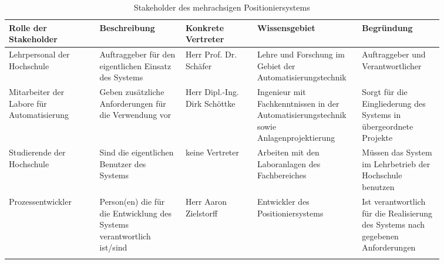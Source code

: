 \documentclass[../../../Bachelorarbeit.tex]{subfiles}
\begin{document}
\begin{longtable}[C]{| R{0.19\linewidth} | R{0.18\linewidth} | R{0.15\linewidth} | R{0.17\linewidth} | R{0.17\linewidth} |}
    \hline
    \textbf{Rolle der Stakeholder} & \textbf{Beschreibung} & \textbf{Konkrete Vertreter} & \textbf{Wissensgebiet} & \textbf{Begründung} \\ \hline
    Lehrpersonal der Hochschule & Auftraggeber für den eigentlichen Einsatz des Systems & Herr Prof. Dr. Schäfer \newline{}  & Lehre und Forschung im Gebiet der Automatisierungstechnik & Auftraggeber und Verantwortlicher \\ \hline
    Mitarbeiter der Labore für Automatisierung & Geben zusätzliche Anforderungen für die Verwendung vor & Herr Dipl.-Ing. Dirk Schöttke \newline{}  & Ingenieur mit Fachkenntnissen in der Automatisierungstechnik sowie Anlagenprojektierung & Sorgt für die Eingliederung des Systems in übergeordnete Projekte \\ \hline
    Studierende der Hochschule & Sind die eigentlichen Benutzer des Systems & keine Vertreter & Arbeiten mit den Laboranlagen des Fachbereiches & Müssen das System im Lehrbetrieb der Hochschule benutzen \\ \hline
    Prozessentwickler & Person(en) die für die Entwicklung des Systems verantwortlich ist/sind & Herr Aaron Zielstorff \newline{} & Entwickler des Positioniersystems & Ist verantwortlich für die Realisierung des Systems nach gegebenen Anforderungen \\ \hline
    \caption[Stakeholder]{Stakeholder des mehrachsigen Positioniersystems}
    \label{tab:my-table40}
\end{longtable}
\end{document}
